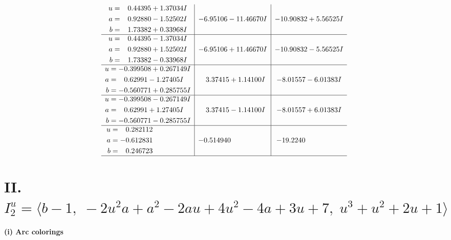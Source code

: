 \documentclass[1p]{elsarticle_modified}
\theoremstyle{definition}
\begin{document}
$$\begin{array}{c|c|c}
\begin{aligned}
u &= \phantom{-}0.44395 + 1.37034 I \\
a &= \phantom{-}0.92880 - 1.52502 I \\
b &= \phantom{-}1.73382 + 0.33968 I\end{aligned}
 & -6.95106 - 11.46670 I & -10.90832 + 5.56525 I \\ \hline\begin{aligned}
u &= \phantom{-}0.44395 - 1.37034 I \\
a &= \phantom{-}0.92880 + 1.52502 I \\
b &= \phantom{-}1.73382 - 0.33968 I\end{aligned}
 & -6.95106 + 11.46670 I & -10.90832 - 5.56525 I \\ \hline\begin{aligned}
u &= -0.399508 + 0.267149 I \\
a &= \phantom{-}0.62991 - 1.27405 I \\
b &= -0.560771 + 0.285755 I\end{aligned}
 & \phantom{-}3.37415 + 1.14100 I & -8.01557 - 6.01383 I \\ \hline\begin{aligned}
u &= -0.399508 - 0.267149 I \\
a &= \phantom{-}0.62991 + 1.27405 I \\
b &= -0.560771 - 0.285755 I\end{aligned}
 & \phantom{-}3.37415 - 1.14100 I & -8.01557 + 6.01383 I \\ \hline\begin{aligned}
u &= \phantom{-}0.282112\phantom{ +0.000000I} \\
a &= -0.612831\phantom{ +0.000000I} \\
b &= \phantom{-}0.246723\phantom{ +0.000000I}\end{aligned}
 & -0.514940\phantom{ +0.000000I} & -19.2240\phantom{ +0.000000I}\\
 \hline 
 \end{array}$$\newpage\newpage\renewcommand{\arraystretch}{1}
\centering \section*{II. $I^u_{2}= \langle b-1,\;-2 u^2 a+a^2-2 a u+4 u^2-4 a+3 u+7,\;u^3+u^2+2 u+1 \rangle$}
\flushleft \textbf{(i) Arc colorings}\\
\end{document}
